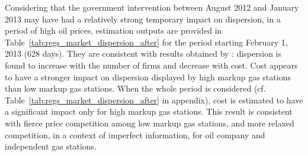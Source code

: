 \documentclass[english]{article}
\begin{document}
Considering that the government intervention between August 2012 and January 2013 may have had a relatively strong temporary impact on dispersion, in a period of high oil prices, estimation outputs are provided in Table~\ref{tab:regs_market_dispersion_after} for the period starting February 1, 2013 (628 days). They are consistent with results obtained by \cite{TAP11}: dispersion is found to increase with the number of firms and decrease with cost. Cost appears to have a stronger impact on dispersion displayed by high markup gas stations than low markup gas stations. When the whole period is considered (cf. Table~\ref{tab:regs_market_dispersion_after} in appendix), cost is estimated to have a significant impact only for high markup gas stations. This result is consistent with fierce price competition among low markup gas stations, and more relaxed competition, in a context of imperfect information, for oil company and independent gas stations.
\end{document}
